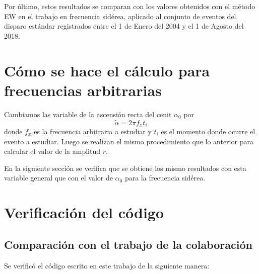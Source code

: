 \documentclass[11pt,papel,oneside,singlespace]{ibtesis}
\begin{document}


Por último, estos resultados se comparan con los valores obtenidos con el método EW en el trabajo \cite{Aab_2020} en frecuencia sidérea, aplicado al conjunto de eventos del disparo estándar registrados entre el 1 de Enero del 2004 y el 1 de Agosto del 2018. 



\section{Cómo se hace el cálculo para frecuencias  arbitrarias}

Cambiamos las variable de la ascensión recta del cenit $\alpha_0$ por
\begin{equation}
    \tilde{\alpha} = 2\pi f_x t_i  \label{ra_arb}
  \end{equation}
donde $f_x$ es la frecuencia arbitraria a estudiar y $t_i$ es el momento donde ocurre el evento a estudiar. Luego se realizan el mismo procedimiento que lo anterior para calcular el valor de la amplitud $r$.

En la siguiente sección se verifica que se obtiene los mismo resultados con esta variable general que con el valor de $\alpha_0$ para la frecuencia sidérea.

\section{Verificación del código}

\subsection{Comparación con el trabajo \cite{Aab_2020} de la colaboración}
Se verificó el código escrito en este trabajo de la siguiente manera:
\end{document}
